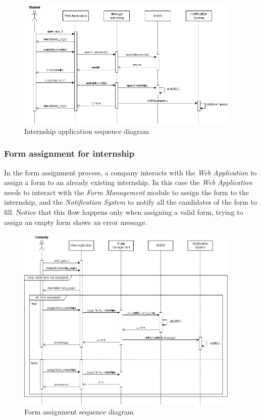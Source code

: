 \documentclass[11pt,twoside]{article}
\begin{document}
\begin{figure}[H]
\centering
\includegraphics[width=0.95\textwidth]{Images/Seq4}
\caption{Internship application sequence diagram}\label{Seq4}
\end{figure}

\newpage

		\subsubsection{Form assignment for internship}
In the form assignment process, a company interacts with the \textit{Web Application} to assign a form to an already existing internship. In this case the \textit{Web Application} needs to interact with the \textit{Form Management} module to assign the form to the internship, and the \textit{Notification System} to notify all the candidates of the form to fill. Notice that this flow happens only when assigning a valid form, trying to assign an empty form shows an error message.
		
\begin{figure}[H]
\centering
\includegraphics[width=0.95\textwidth]{Images/Seq5}
\caption{Form assignment sequence diagram}\label{Seq5}
\end{figure}
\end{document}
